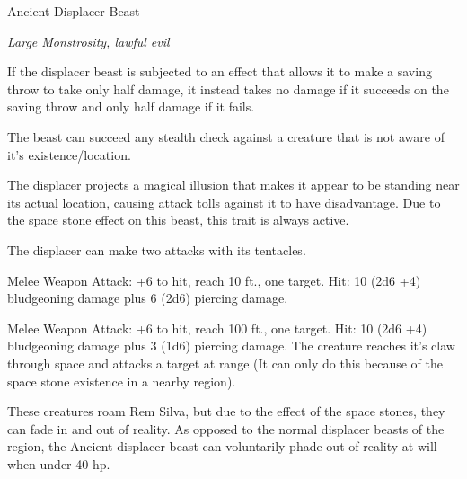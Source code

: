 \begin{monsterbox}{Ancient Displacer Beast}
	\begin{hangingpar}
		\textit{Large Monstrosity, lawful evil}
	\end{hangingpar}
	\dndline%
	\basics[%
	armorclass = 16,
	hitpoints  = 170,
	speed      = 40 ft
	]
	\dndline%
	\stats[
	STR = \stat{19}, %
	DEX = \stat{16},
	CON = \stat{17},
	INT = \stat{7},
	WIS = \stat{13},
	CHA = \stat{9}
	]
	\dndline%
	\details[%
	senses = {darkvision 70 ft., passive perception 12},
	challenge = 6 (700XP)
	]
	\dndline%
	\begin{monsteraction}[Avoidance]
		If the displacer beast is subjected to an effect that allows it to make a saving throw to take only half damage, it instead takes no damage if it succeeds on the saving throw and only half damage if it fails.
	\end{monsteraction}	
	\begin{monsteraction}
		The beast can succeed any stealth check against a creature that is not aware of it's existence/location.
	\end{monsteraction}	
	\begin{monsteraction}[Displacement]
		The displacer projects a magical illusion that makes it appear to be standing near its actual location, causing attack tolls against it to have disadvantage. Due to the space stone effect on this beast, this trait is always active.
	\end{monsteraction}	
	\begin{monsteraction}[Multiattack]
		The displacer can make two attacks with its tentacles. 
	\end{monsteraction}
	\begin{monsteraction}[Tentacle]
		Melee Weapon Attack: +6 to hit, reach 10 ft., one target. Hit: 10 (2d6 +4) bludgeoning damage plus 6 (2d6) piercing damage.
	\end{monsteraction}
	\begin{monsteraction}
		Melee Weapon Attack: +6 to hit, reach 100 ft., one target. Hit: 10 (2d6 +4) bludgeoning damage plus 3 (1d6) piercing damage. The creature reaches it's claw through space and attacks a target at range (It can only do this because of the space stone existence in a nearby region).
	\end{monsteraction}	
	These creatures roam Rem Silva, but due to the effect of the space stones, they can fade in and out of reality. As opposed to the normal displacer beasts of the region, the Ancient displacer beast can voluntarily phade out of reality at will when under 40 hp.
\end{monsterbox}


